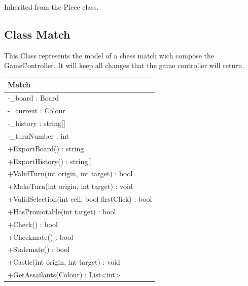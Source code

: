 \documentclass[12pt]{article}
\begin{document}
    Inherited from the Piece class.

\newpage


\subsection{Class Match}

This Class represents the model of a chess match wich compose the
GameController. It will keep all changes that the game controller will return.

\begin{table}[H]
    \begin{tabular}{|l|}
    \hline
    \rowcolor[HTML]{C0C0C0} 
    \textbf{Match}                                    \\ \hline
    \rowcolor[HTML]{EFEFEF} 
    -\_board : Board                                  \\ \hline
    \rowcolor[HTML]{EFEFEF} 
    -\_current : Colour                               \\ \hline
    \rowcolor[HTML]{EFEFEF} 
    -\_history : string{[}{]}                         \\ \hline
    \rowcolor[HTML]{EFEFEF} 
    -\_turnNumber : int                               \\ \hline
    +ExportBoard() : string                           \\ \hline
    +ExportHistory() : string[]                       \\ \hline
    +ValidTurn(int origin, int target) : bool         \\ \hline
    +MakeTurn(int origin, int target) : void          \\ \hline
    +ValidSelection(int cell, bool firstClick) : bool \\ \hline
    +HasPromotable(int target) : bool                 \\ \hline
    +Check() : bool                                   \\ \hline
    +Checkmate() : bool                               \\ \hline
    +Stalemate() : bool                               \\ \hline
    +Castle(int origin, int target) : void            \\ \hline
    +GetAssailants(Colour) : List<int>                \\ \hline
\end{tabular}
\end{table}
\end{document}
